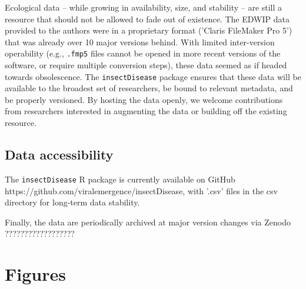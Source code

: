\documentclass[12pt]{article}
\begin{document}
Ecological data -- while growing in availability, size, and stability -- are still a resource that should not be allowed to fade out of existence. The EDWIP data provided to the authors were in a proprietary format ('Claris FileMaker Pro 5') that was already over 10 major versions behind. With limited inter-version operability (e.g., \texttt{.fmp5} files cannot be opened in more recent versions of the software, or require multiple conversion steps), these data seemed as if headed towards obsolescence. The \texttt{insectDisease} package ensures that these data will be available to the broadest set of researchers, be bound to relevant metadata, and be properly versioned. By hosting the data openly, we welcome contributions from researchers interested in augmenting the data or building off the existing resource. 







\subsection*{Data accessibility}

The \texttt{insectDisease} R package is currently available on GitHub https://github.com/viralemergence/insectDisease, with '.csv' files in the csv directory for long-term data stability. 

Finally, the data are periodically archived at major version changes via Zenodo ?????????????????? 
 















\clearpage


\clearpage


























\clearpage

\section*{Figures}
\end{document}
